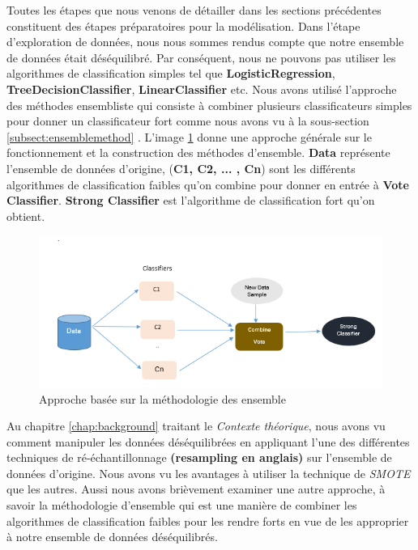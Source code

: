 \documentclass[12pt, french]{report}
\begin{document}
Toutes les étapes que nous venons de détailler dans les sections précédentes constituent des étapes préparatoires pour la modélisation. Dans l'étape d'exploration de données, nous nous sommes rendus compte que notre ensemble de données était déséquilibré. Par conséquent, nous ne pouvons pas utiliser les algorithmes de classification simples tel que \textbf{LogisticRegression}, \textbf{TreeDecisionClassifier}, \textbf{LinearClassifier} etc. Nous avons utilisé l'approche des méthodes ensembliste qui consiste à combiner plusieurs classificateurs simples pour donner un classificateur fort comme nous avons vu à la sous-section \ref{subsect:ensemblemethod} . L'image \ref{ensemble} donne une approche générale sur le fonctionnement et la construction des méthodes d'ensemble. \textbf{Data} représente l'ensemble de données d'origine, (\textbf{C1, C2, ... , Cn}) sont les différents algorithmes de classification faibles qu'on combine pour donner en entrée à \textbf{Vote Classifier}. \textbf{Strong Classifier} est l'algorithme de classification fort qu'on obtient. \\

\begin{figure}[h]
	\includegraphics{images/ensemble.png}
	\caption{Approche basée sur la méthodologie des ensemble \cite{key19} }
	\label{ensemble}
\end{figure}

Au chapitre \ref{chap:background} traitant le \textit{Contexte théorique}, nous avons vu comment manipuler les données déséquilibrées en appliquant l'une des différentes techniques de ré-échantillonnage \textbf{(resampling en anglais)} sur l'ensemble de données d'origine. Nous avons vu les avantages à utiliser la technique de \textit{SMOTE} que les autres. Aussi nous avons brièvement examiner une autre approche, à savoir la méthodologie d'ensemble qui est une manière de combiner les algorithmes de classification faibles pour les rendre forts en vue de les approprier à notre ensemble de données déséquilibrés. 
\end{document}
